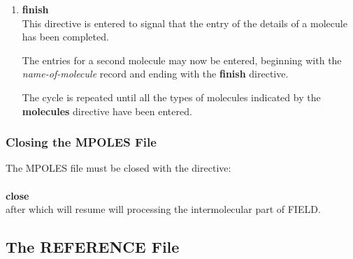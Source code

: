 \begin{enumerate}
\D will read same order momenta in their natural vector format:
\begin{tabbing}
X\=XXXXXXXX\=XXXXXXXX\=\kill
\> {\tt charge}       \> real(1)  \> scalar $q$ (in protons) \\
\> {\tt dipole}       \> real(3)  \> vector $(x,y,z)$ (in protons/\AA) \\
\> {\tt quadrupole}   \> real(6)  \> vector $(xx,xy,xz,yy,yz,zz)$ (in protons/\AA$^{2}$) \\
\> {\tt octupole}     \> real(10) \> vector $(xxx,xxy,xxz,xyy,xyz,xzz,yyy,yyz,yzz,zzz)$ (in protons/\AA$^{3}$) \\
\> {\tt hexadecapole} \> real(15) \> vector $(xxxx,xxxy,xxxz,....,yyyz,yyzz,yzzz,zzzz)$ (in protons/\AA$^{4}$)
\end{tabbing}
{\bf Note} that the charge values supplied in FIELD will be
overwritten with those supplied here!

{\bf Note}, although algorithms in \D could in principle handle
any high pole order summation, in practice, however, \D will abort
if the order is higher than hexadecapole (order 4)!

\item {\bf finish} \\
This directive is entered to signal \D that the entry of the
details of a molecule has been completed.

The entries for a second molecule may now be entered, beginning with
the {\em name-of-molecule} record and ending with the {\bf finish}
directive.

The cycle is repeated until all the types of molecules indicated by
the {\bf molecules} directive have been entered.

\end{enumerate}

\subsubsection{Closing the MPOLES File}

The MPOLES file must be closed with the directive:\\
\\
{\bf close}
\\
after which \D will resume will processing the intermolecular part of FIELD.

\subsection{The REFERENCE File}
\label{reference-file}

